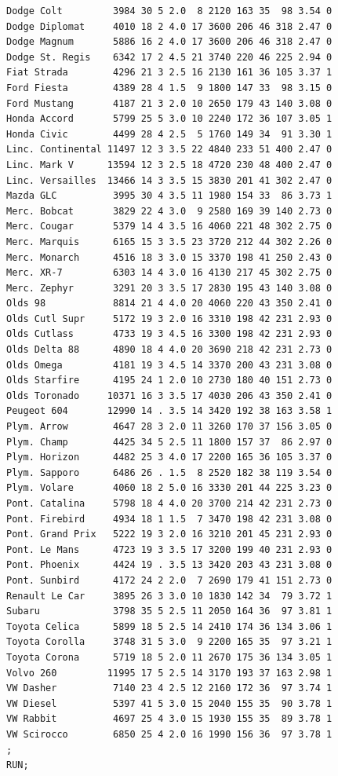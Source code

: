 \documentclass[
]{book}
\begin{document}
\begin{verbatim}
Dodge Colt         3984 30 5 2.0  8 2120 163 35  98 3.54 0
Dodge Diplomat     4010 18 2 4.0 17 3600 206 46 318 2.47 0
Dodge Magnum       5886 16 2 4.0 17 3600 206 46 318 2.47 0
Dodge St. Regis    6342 17 2 4.5 21 3740 220 46 225 2.94 0
Fiat Strada        4296 21 3 2.5 16 2130 161 36 105 3.37 1
Ford Fiesta        4389 28 4 1.5  9 1800 147 33  98 3.15 0
Ford Mustang       4187 21 3 2.0 10 2650 179 43 140 3.08 0
Honda Accord       5799 25 5 3.0 10 2240 172 36 107 3.05 1
Honda Civic        4499 28 4 2.5  5 1760 149 34  91 3.30 1
Linc. Continental 11497 12 3 3.5 22 4840 233 51 400 2.47 0
Linc. Mark V      13594 12 3 2.5 18 4720 230 48 400 2.47 0
Linc. Versailles  13466 14 3 3.5 15 3830 201 41 302 2.47 0
Mazda GLC          3995 30 4 3.5 11 1980 154 33  86 3.73 1
Merc. Bobcat       3829 22 4 3.0  9 2580 169 39 140 2.73 0
Merc. Cougar       5379 14 4 3.5 16 4060 221 48 302 2.75 0
Merc. Marquis      6165 15 3 3.5 23 3720 212 44 302 2.26 0
Merc. Monarch      4516 18 3 3.0 15 3370 198 41 250 2.43 0
Merc. XR-7         6303 14 4 3.0 16 4130 217 45 302 2.75 0
Merc. Zephyr       3291 20 3 3.5 17 2830 195 43 140 3.08 0
Olds 98            8814 21 4 4.0 20 4060 220 43 350 2.41 0
Olds Cutl Supr     5172 19 3 2.0 16 3310 198 42 231 2.93 0
Olds Cutlass       4733 19 3 4.5 16 3300 198 42 231 2.93 0
Olds Delta 88      4890 18 4 4.0 20 3690 218 42 231 2.73 0
Olds Omega         4181 19 3 4.5 14 3370 200 43 231 3.08 0
Olds Starfire      4195 24 1 2.0 10 2730 180 40 151 2.73 0
Olds Toronado     10371 16 3 3.5 17 4030 206 43 350 2.41 0
Peugeot 604       12990 14 . 3.5 14 3420 192 38 163 3.58 1
Plym. Arrow        4647 28 3 2.0 11 3260 170 37 156 3.05 0
Plym. Champ        4425 34 5 2.5 11 1800 157 37  86 2.97 0
Plym. Horizon      4482 25 3 4.0 17 2200 165 36 105 3.37 0
Plym. Sapporo      6486 26 . 1.5  8 2520 182 38 119 3.54 0
Plym. Volare       4060 18 2 5.0 16 3330 201 44 225 3.23 0
Pont. Catalina     5798 18 4 4.0 20 3700 214 42 231 2.73 0
Pont. Firebird     4934 18 1 1.5  7 3470 198 42 231 3.08 0
Pont. Grand Prix   5222 19 3 2.0 16 3210 201 45 231 2.93 0
Pont. Le Mans      4723 19 3 3.5 17 3200 199 40 231 2.93 0
Pont. Phoenix      4424 19 . 3.5 13 3420 203 43 231 3.08 0
Pont. Sunbird      4172 24 2 2.0  7 2690 179 41 151 2.73 0
Renault Le Car     3895 26 3 3.0 10 1830 142 34  79 3.72 1
Subaru             3798 35 5 2.5 11 2050 164 36  97 3.81 1
Toyota Celica      5899 18 5 2.5 14 2410 174 36 134 3.06 1
Toyota Corolla     3748 31 5 3.0  9 2200 165 35  97 3.21 1
Toyota Corona      5719 18 5 2.0 11 2670 175 36 134 3.05 1
Volvo 260         11995 17 5 2.5 14 3170 193 37 163 2.98 1
VW Dasher          7140 23 4 2.5 12 2160 172 36  97 3.74 1
VW Diesel          5397 41 5 3.0 15 2040 155 35  90 3.78 1
VW Rabbit          4697 25 4 3.0 15 1930 155 35  89 3.78 1
VW Scirocco        6850 25 4 2.0 16 1990 156 36  97 3.78 1
;
RUN;



\end{verbatim}
\end{document}
